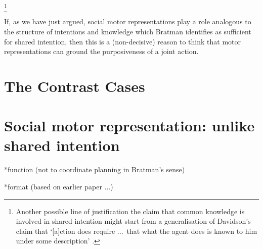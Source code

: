 \documentclass[12pt,\papersize]{extarticle}
\begin{document}
\footnote{
Another possible line of justification the claim that common knowledge is involved in shared intention might start from a generalisation of Davidson's claim that
`[a]ction does require %
...\ that what the agent does is known to him under some description' \citep[p.\ 50]{Davidson:1971fz}.
} 

If, as we have just argued, social motor representations play a role analogous to the structure of intentions and knowledge which Bratman identifies as sufficient for shared intention, then this is a  (non-decisive)  reason to think that motor representations can ground the purposiveness of a joint action.


\section{The Contrast Cases}


\section{Social motor representation: unlike shared intention}

*function (not to coordinate planning in Bratman's sense)

*format (based on earlier paper ...)
\end{document}
